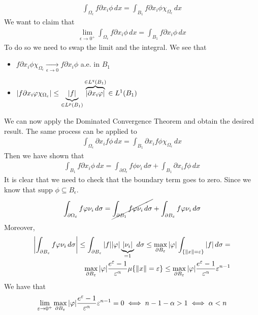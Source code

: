 \[
    \begin{split}
        \int_{\Omega_\epsilon} f \partial x_i \phi \, dx = \int_{B_1} f \partial x_i \phi \chi_{\Omega_\epsilon} \, dx
    \end{split}
\]
We want to claim that 
\[
    \begin{split}
        \lim_{\epsilon \to 0^+} \int_{\Omega_\epsilon} f \partial x_i \phi \, dx = \int_{B_1} f \partial x_i \phi \, dx
    \end{split}
\]
To do so we need to swap the limit and the integral. We see that 
\begin{itemize}
    \item \(f \partial x_i \phi \chi_{\Omega_\epsilon} \underset{\epsilon \to 0}{\longrightarrow} f \partial x_i \phi\) a.e. in \(B_1\)
    \item \(\abs{f \partial x_i \phi \chi_{\Omega_\epsilon}} \leq \underbrace{\abs{f}}_{\in L^p(B_1)} \overbrace{\abs{\partial x_i \phi}}^{\in L^q(B_1)} \in L^1(B_1)\)
\end{itemize}
We can now apply the Dominated Convergence Theorem and obtain the desired result. 
The same process can be applied to
\[
    \begin{split}
        \int_{\Omega_\epsilon} \partial x_i f \phi \, dx = \int_{B_1} \partial x_i f \phi \chi_{\Omega_\epsilon} \, dx
    \end{split}
\]
Then we have shown that 
\[
    \begin{split}
        \int_{B_1} f \partial x_i \phi \, dx = \int_{\partial\Omega_\epsilon} f \phi \nu_i \, d\sigma + \int_{B_1} \partial x_i f \phi \, dx
    \end{split}
\]
It is clear that we need to check that the boundary term goes to zero. Since we know that \(\text{supp } \phi \subseteq B_\epsilon\).
\[
    \begin{split}
        \int_{\partial\Omega_\epsilon} f \phi \nu_i \, d\sigma = \cancel{\int_{\partial B_1} f \phi \nu_i \, d\sigma} + \int_{\partial B_\epsilon} f \phi \nu_i \, d\sigma
    \end{split}
\]
Moreover,
\[
    \begin{split}
        \abs{\int_{\partial B_\epsilon} f \phi \nu_i \, d\sigma} \leq \int_{\partial B_\epsilon} \abs{f} \abs{\phi} \underbrace{\abs{\nu_i}}_{=1} \, d\sigma \leq \max_{\partial B_\epsilon} \abs{\phi} \int_{\{ \norm{x} = \epsilon \}} \abs{f} \, d\sigma = \\
        \max_{\partial B_\epsilon} \abs{\phi} \frac{e^{\epsilon} - 1}{\epsilon^\alpha} \mu\{\norm{x} = \epsilon\} \leq \max_{\partial B_\epsilon} \abs{\phi} \frac{e^{\epsilon} - 1}{\epsilon^\alpha} \epsilon^{n-1} 
    \end{split}
\]
We have that 
\[
    \begin{split}
        \lim_{\epsilon \to 0^+} \max_{\partial B_\epsilon} \abs{\phi} \frac{e^{\epsilon} - 1}{\epsilon^\alpha} \epsilon^{n-1} = 0 \iff n -1 -\alpha >  1 \iff \alpha < n 
    \end{split}
\]

